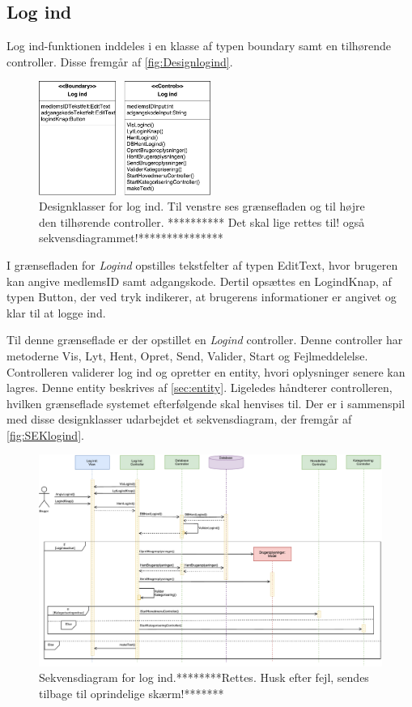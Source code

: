 \subsection*{Log ind}
Log ind-funktionen inddeles i en klasse af typen boundary samt en tilhørende controller. Disse fremgår af \autoref{fig:Designlogind}. 

\begin{figure} [H]
\centering
\includegraphics[width=0.5\textwidth]{figures/MVC/MVCLogInd}
\caption{Designklasser for log ind. Til venstre ses grænsefladen og til højre den tilhørende controller. ********** Det skal lige rettes til! også sekvensdiagrammet!***************}
\label{fig:Designlogind}
\end{figure}

\noindent
I grænsefladen for \textit{Logind} opstilles tekstfelter af typen EditText, hvor brugeren kan angive medlemsID samt adgangskode. Dertil opsættes en LogindKnap, af typen Button, der ved tryk indikerer, at brugerens informationer er angivet og klar til at logge ind. 

Til denne grænseflade er der opstillet en \textit{Logind} controller. Denne controller har metoderne Vis, Lyt, Hent, Opret, Send, Valider, Start og Fejlmeddelelse. Controlleren validerer log ind og opretter en entity, hvori oplysninger senere kan lagres. Denne entity beskrives af \autoref{sec:entity}. Ligeledes håndterer controlleren, hvilken grænseflade systemet efterfølgende skal henvises til. Der er i sammenspil med disse designklasser udarbejdet et sekvensdiagram, der fremgår af \autoref{fig:SEKlogind}.

\begin{figure} [H]
\centering
\includegraphics[width=1.55\textwidth, angle=90]{figures/Sek/SEKLogInd}
\caption{Sekvensdiagram for log ind.********Rettes. Husk efter fejl, sendes tilbage til oprindelige skærm!*******}
\label{fig:SEKlogind}
\end{figure}

